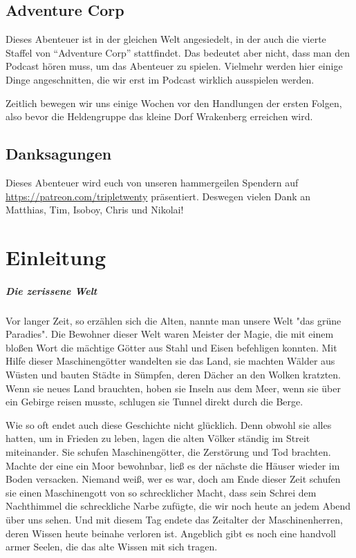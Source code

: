 \section{Adventure Corp}

Dieses Abenteuer ist in der gleichen Welt angesiedelt, in der auch die vierte Staffel von ``Adventure Corp'' stattfindet. Das bedeutet aber nicht, dass man den Podcast hören muss, um das Abenteuer zu spielen. Vielmehr werden hier einige Dinge angeschnitten, die wir erst im Podcast wirklich ausspielen werden.

Zeitlich bewegen wir uns einige Wochen vor den Handlungen der ersten Folgen, also bevor die Heldengruppe das kleine Dorf Wrakenberg erreichen wird.

\section{Danksagungen}

Dieses Abenteuer wird euch von unseren hammergeilen Spendern auf \url{https://patreon.com/tripletwenty} präsentiert. Deswegen vielen Dank an Matthias, Tim, Isoboy, Chris und Nikolai!


\chapter*{Einleitung}

\paragraph{Die zerissene Welt}

Vor langer Zeit, so erzählen sich die Alten, nannte man unsere Welt "das grüne Paradies". Die Bewohner dieser Welt waren Meister der Magie, die mit einem bloßen Wort die mächtige Götter aus Stahl und Eisen befehligen konnten. Mit Hilfe dieser Maschinengötter wandelten sie das Land, sie machten Wälder aus Wüsten und bauten Städte in Sümpfen, deren Dächer an den Wolken kratzten. Wenn sie neues Land brauchten, hoben sie Inseln aus dem Meer, wenn sie über ein Gebirge reisen musste, schlugen sie Tunnel direkt durch die Berge.

Wie so oft endet auch diese Geschichte nicht glücklich. Denn obwohl sie alles hatten, um in Frieden zu leben, lagen die alten Völker ständig im Streit miteinander. Sie schufen Maschinengötter, die Zerstörung und Tod brachten. Machte der eine ein Moor bewohnbar, ließ es der nächste die Häuser wieder im Boden versacken. Niemand weiß, wer es war, doch am Ende dieser Zeit schufen sie einen Maschinengott von so schrecklicher Macht, dass sein Schrei dem Nachthimmel die schreckliche Narbe zufügte, die wir noch heute an jedem Abend über uns sehen. Und mit diesem Tag endete das Zeitalter der Maschinenherren, deren Wissen heute beinahe verloren ist. Angeblich gibt es noch eine handvoll armer Seelen, die das alte Wissen mit sich tragen.

